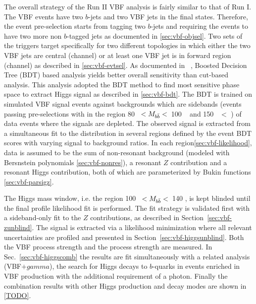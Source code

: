 The overall strategy of the Run II VBF \Hbb analysis is fairly similar to that of Run I. The VBF \Hbb events have two $b$-jets and two VBF jets in the final states. Therefore, the event pre-selection starts from tagging two $b$-jets and requiring the events to have two more non $b$-tagged jets as documented in \ref{sec:vbf-objsel}. Two sets of the triggers target specifically for two different topologies in which either the two VBF jets are central (\fourcentral channel) or at least one VBF jet is in forward region (\twocentral channel) as described in \ref{sec:vbf-evtsel}. As documented in ~\cite{HIGG-2014-12}, Boosted Decision Tree (BDT) based analysis yields better overall sensitivity than cut-based analysis. This analysis adopted the BDT method to find most sensitive phase space to extract Higgs signal as described in \ref{sec:vbf-bdt}. The BDT is trained on simulated VBF signal events against backgrounds which are sidebands (events passing pre-selections with \Mbb in the region 80 \GeV~$< M_{b\bar{b}}<$~100 \GeV~ and  150 \GeV~$<$ \Mbb) of data events where the signals are depleted. The observed signal is extracted from a simultaneous fit to the \Mbb distribution in several regions defined by the event BDT scores with varying signal to background ratios. In each region\ref{sec:vbf-likelihood}, data is assumed to be the sum of non-resonant background (modeled with Bersnstein polynomials \ref{sec:vbf-nonres}), a resonant $Z$ contribution and a resonant Higgs contribution, both of which are parameterized by Bukin functions \ref{sec:vbf-parsigz}.

The Higgs mass window, i.e. the region 100 \GeV~$< M_{b\bar{b}}<$~140 \GeV, is kept blinded until the final profile likelihood fit is performed.  The fit strategy is validated first with a sideband-only fit to the $Z$ contributions, as described in Section~\ref{sec:vbf-zunblind}. The signal is extracted via a likelihood minimization where all relevant uncertainties are profiled and presented in Section~\ref{sec:vbf-higgsunblind}. Both the VBF process strength and the \Hbb process strength are measured. In Sec.~\ref{sec:vbf-higgscomb} the results are fit simultaneously with a related analysis (VBF$+gamma$), the search for Higgs decays to $b$-quarks in events enriched in VBF production with the additional requirement of a photon. Finally the combination results with other Higgs production and decay modes are shown in \ref{TODO}.




